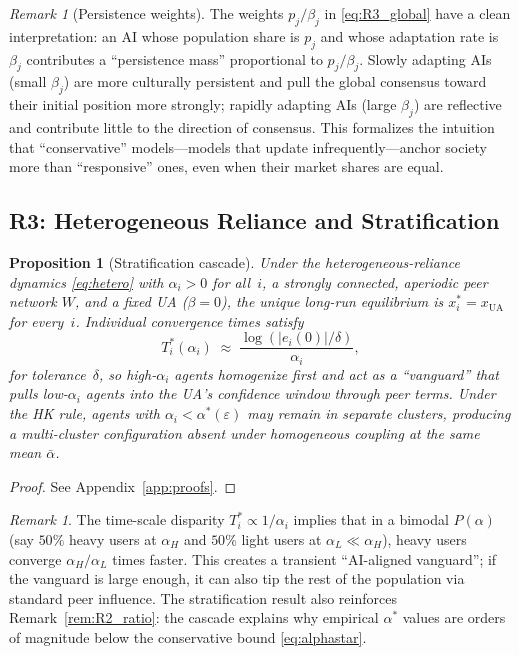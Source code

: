 \documentclass{article}
\theoremstyle{plain}
\newtheorem{proposition}[theorem]{Proposition}
\theoremstyle{definition}
\theoremstyle{remark}
\newtheorem{remark}[theorem]{Remark}
\newcommand{\xUA}{x_{\mathrm{UA}}}
\begin{document}
\begin{remark}[Persistence weights]
\label{rem:persistence}
The weights $p_j/\beta_j$ in \eqref{eq:R3_global} have a clean
interpretation: an AI whose population share is $p_j$ and whose
adaptation rate is $\beta_j$ contributes a ``persistence mass''
proportional to $p_j/\beta_j$.  Slowly adapting AIs (small $\beta_j$)
are more culturally persistent and pull the global consensus
toward their initial position more strongly; rapidly adapting AIs
(large $\beta_j$) are reflective and contribute little to the
direction of consensus.  This formalizes the intuition that
``conservative'' models---models that update infrequently---anchor
society more than ``responsive'' ones, even when their market
shares are equal.
\end{remark}

\subsection{R3: Heterogeneous Reliance and Stratification}
\label{subsec:R3}

\begin{proposition}[Stratification cascade]
\label{prop:R4}
Under the heterogeneous-reliance dynamics \eqref{eq:hetero} with
$\alpha_i>0$ for all~$i$, a strongly connected, aperiodic peer
network $W$, and a fixed UA ($\beta=0$), the unique long-run
equilibrium is $x_i^*=\xUA$ for every~$i$.  Individual convergence
times satisfy
\begin{equation}
    T_i^*(\alpha_i) \;\approx\; \frac{\log(|e_i(0)|/\delta)}{\alpha_i},
    \label{eq:Ti}
\end{equation}
for tolerance~$\delta$, so high-$\alpha_i$ agents homogenize first
and act as a ``vanguard'' that pulls low-$\alpha_i$ agents into the
UA's confidence window through peer terms.  Under the HK rule,
agents with $\alpha_i<\alpha^*(\varepsilon)$ may remain in separate
clusters, producing a multi-cluster configuration absent under
homogeneous coupling at the same mean $\bar\alpha$.
\end{proposition}

\begin{proof}
See Appendix~\ref{app:proofs}.
\end{proof}

\begin{remark}
The time-scale disparity $T_i^*\propto 1/\alpha_i$ implies that in a
bimodal $P(\alpha)$ (say $50\%$ heavy users at $\alpha_H$ and $50\%$
light users at $\alpha_L\ll\alpha_H$), heavy users converge
$\alpha_H/\alpha_L$ times faster.  This creates a transient
``AI-aligned vanguard''; if the vanguard is large enough, it can
also tip the rest of the population via standard peer influence.
The stratification result also reinforces Remark~\ref{rem:R2_ratio}:
the cascade explains why empirical $\alpha^*$ values are orders of
magnitude below the conservative bound \eqref{eq:alphastar}.
\end{remark}
\end{document}
